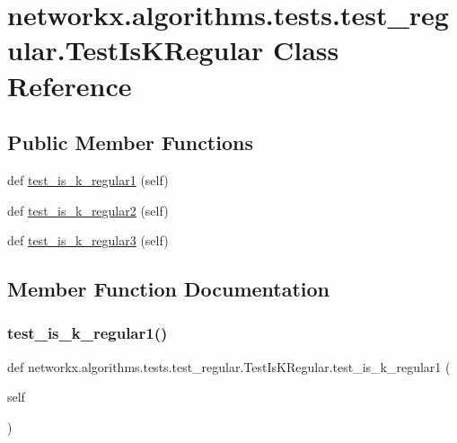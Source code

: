 \hypertarget{classnetworkx_1_1algorithms_1_1tests_1_1test__regular_1_1TestIsKRegular}{}\section{networkx.\+algorithms.\+tests.\+test\+\_\+regular.\+Test\+Is\+K\+Regular Class Reference}
\label{classnetworkx_1_1algorithms_1_1tests_1_1test__regular_1_1TestIsKRegular}
\subsection*{Public Member Functions}
\begin{DoxyCompactItemize}
\item 
def \hyperlink{classnetworkx_1_1algorithms_1_1tests_1_1test__regular_1_1TestIsKRegular_a4349f2412aa75ac624e5d524da5d02ac}{test\+\_\+is\+\_\+k\+\_\+regular1} (self)
\item 
def \hyperlink{classnetworkx_1_1algorithms_1_1tests_1_1test__regular_1_1TestIsKRegular_a772f415cc9d8ceb6559acecf31363048}{test\+\_\+is\+\_\+k\+\_\+regular2} (self)
\item 
def \hyperlink{classnetworkx_1_1algorithms_1_1tests_1_1test__regular_1_1TestIsKRegular_aff9a77bcb9c24d677e58ad002fba0a05}{test\+\_\+is\+\_\+k\+\_\+regular3} (self)
\end{DoxyCompactItemize}


\subsection{Member Function Documentation}
\mbox{\label{classnetworkx_1_1algorithms_1_1tests_1_1test__regular_1_1TestIsKRegular_a4349f2412aa75ac624e5d524da5d02ac}} 
\subsubsection{\texorpdfstring{test\+\_\+is\+\_\+k\+\_\+regular1()}{test\_is\_k\_regular1()}}
{\footnotesize\ttfamily def networkx.\+algorithms.\+tests.\+test\+\_\+regular.\+Test\+Is\+K\+Regular.\+test\+\_\+is\+\_\+k\+\_\+regular1 (\begin{DoxyParamCaption}\item[{}]{self }\end{DoxyParamCaption})}

